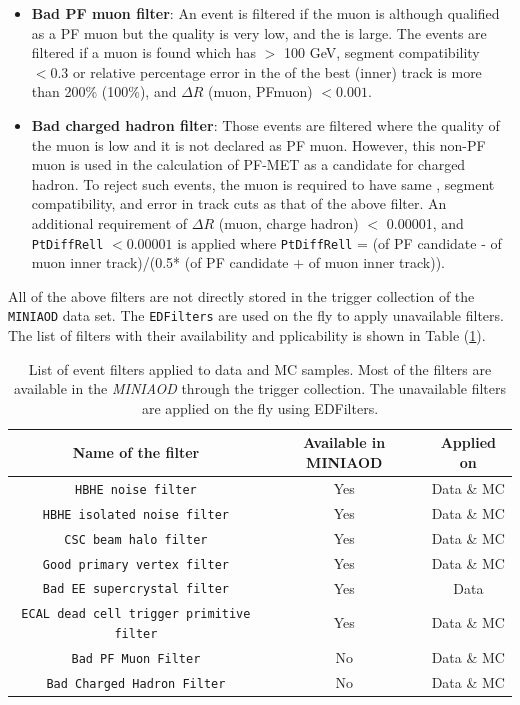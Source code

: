 \begin{itemize}
	\item \textbf{Bad PF muon filter}: An event is filtered if the muon is
		although qualified as a PF muon but the quality is very low, and
		the \pt is large. The events are filtered if a muon is found
		which has \pt $>$ 100 GeV, segment compatibility $< 0.3$ or relative
		percentage error in the \pt of the best (inner) track is more than
		200\% (100\%), and $\Delta R$ (muon, PFmuon) $< 0.001$.
	\item \textbf{Bad charged hadron filter}: Those events are filtered where
		the quality of the muon is low and it is not declared as PF muon.
		However, this non-PF muon is used in the calculation of PF-MET
		as a candidate for charged hadron. To reject such events, the muon
		is required to have same \pt, segment compatibility, and error in
		track cuts as that of the above filter. An additional requirement
    of $\Delta R$ (muon, charge hadron) $<$ 0.00001, and \verb|PtDiffRell|
		$< 0.00001$ is applied where \verb|PtDiffRell| = (\pt of PF candidate - \pt
		of muon inner track)/(0.5* (\pt of PF candidate + \pt of muon inner
		track)).
\end{itemize}

All of the above filters are not directly stored in the trigger collection of the
\verb|MINIAOD| data set. The \verb|EDFilters| are used on the fly to apply unavailable
filters. The list of filters with their availability and pplicability is shown
in Table (\ref{tab:eventFilters}).
\begin{table}
\caption{ List of event filters applied to data and MC samples. Most of the filters
	are available in the {\em MINIAOD} through the trigger collection. The
	unavailable filters are applied on the fly using EDFilters.}
\label{tab:eventFilters}
\centering
\begin{adjustbox}{max width=\textwidth}
 \begin{tabular}{ccc}\hline\hline
  {\bf{Name of the filter}} & {\bf{Available in MINIAOD}} & {\bf{Applied on}}\\\hline\hline
  \verb|HBHE noise filter|            & Yes & Data \& MC \\
  \verb|HBHE isolated noise filter|   & Yes & Data \& MC \\
  \verb|CSC beam halo filter|         & Yes & Data \& MC \\
  \verb|Good primary vertex filter|   & Yes & Data \& MC \\
  \verb|Bad EE supercrystal filter|   & Yes & Data  \\
  \verb|ECAL dead cell trigger primitive filter| & Yes & Data \& MC\\
  \verb|Bad PF Muon Filter|  & No & Data \& MC \\
  \verb|Bad Charged Hadron Filter|        & No & Data \& MC \\\hline
 \end{tabular}
\end{adjustbox}
\end{table}


